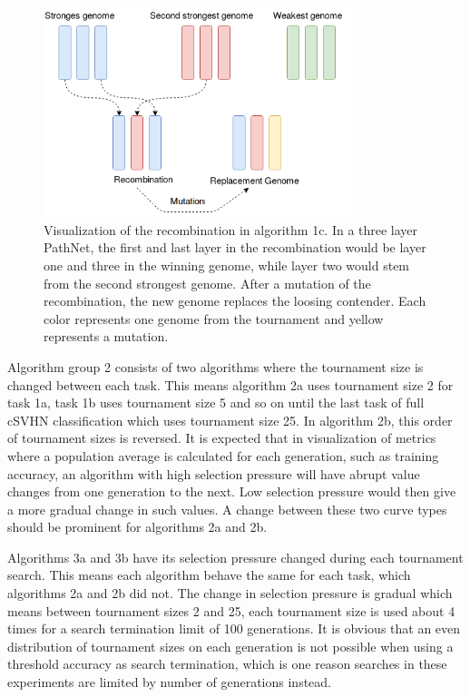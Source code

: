 \begin{figure}[ht]
    \centering
    \includegraphics[width=0.8\textwidth]{Chapters/4.Experiments/exp2/figures/Recombination_algorithm.png}
    \caption{Visualization of the recombination in algorithm 1c. In a three layer PathNet, the first and last layer in the recombination would be layer one and three in the winning genome, while layer two would stem from the second strongest genome. After a mutation of the recombination, the new genome replaces the loosing contender. Each color represents one genome from the tournament and yellow represents a mutation.}
    \label{fig:search.recombination_algorithm}
\end{figure}

Algorithm group 2 consists of two algorithms where the tournament size is changed between each task. This means algorithm 2a uses tournament size 2 for task 1a, task 1b uses tournament size 5 and so on until the last task of full cSVHN classification which uses tournament size 25. In algorithm 2b, this order of tournament sizes is reversed. It is expected that in visualization of metrics where a population average is calculated for each generation, such as training accuracy, an algorithm with high selection pressure will have abrupt value changes from one generation to the next. Low selection pressure would then give a more gradual change in such values. A change between these two curve types should be prominent for algorithms 2a and 2b.

Algorithms 3a and 3b have its selection pressure changed during each tournament search. This means each algorithm behave the same for each task, which algorithms 2a and 2b did not. The change in selection pressure is gradual which means between tournament sizes 2 and 25, each tournament size is used about 4 times for a search termination limit of 100 generations. It is obvious that an even distribution of tournament sizes on each generation is not possible when using a threshold accuracy as search termination, which is one reason searches in these experiments are limited by number of generations instead. 

